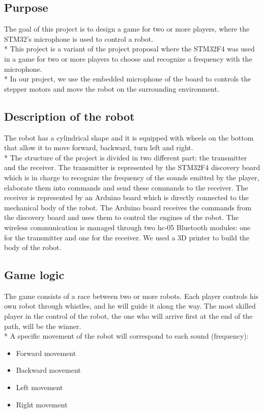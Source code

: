 \subsection{Purpose}
The goal of this project is to design a game for two or more players, where the STM32’s microphone is used to control a robot.\\*
This project is a variant of the project proposal where the STM32F4 was used in a game for two or more players to choose and recognize a frequency with the microphone.\\*
In our project, we use the embedded microphone of the board to controls the stepper motors and move the robot on the surrounding environment.

\subsection{Description of the robot}
The robot has a cylindrical shape and it is equipped with wheels on the bottom that allow it to move forward, backward, turn left and right.\\*
The structure of the project is divided in two different part: the transmitter and the receiver.
The transmitter is represented by the STM32F4 discovery board which is in charge to recognize the frequency of the sounds emitted by the player, elaborate them into commands and send these commands to the receiver.
The receiver is represented by an Arduino board which is directly connected to the mechanical body of the robot. The Arduino board receives the commands from the discovery board and uses them to control the engines of the robot.
The wireless communication is managed through two hc-05 Bluetooth modules: one for the transmitter and one for the receiver.
We used a 3D printer to build the body of the robot. 

\subsection{Game logic}
The game consists of a race between two or more robots. Each player controls his own robot through whistles, and he will guide it along the way. The most skilled player in the control of the robot, the one who will arrive first at the end of the path, will be the winner.\\*
A specific movement of the robot will correspond to each sound (frequency):
\begin{itemize}
	\item Forward movement
	\item Backward movement
	\item Left movement
	\item Right movement
\end{itemize}

